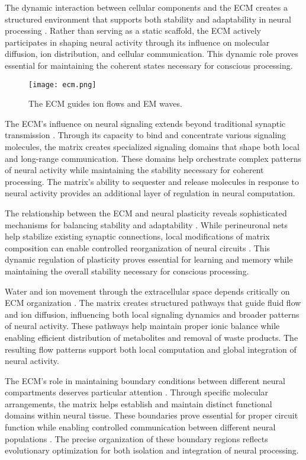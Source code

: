 The dynamic interaction between cellular components and the ECM creates a structured environment that supports both stability and adaptability in neural processing \cite{Dityatev2003}. Rather than serving as a static scaffold, the ECM actively participates in shaping neural activity through its influence on molecular diffusion, ion distribution, and cellular communication. This dynamic role proves essential for maintaining the coherent states necessary for conscious processing.

\begin{figure}[h]
    \centering
    \texttt{[image: ecm.png]}

    \caption{The ECM guides ion flows and EM waves.}
\end{figure}

The ECM's influence on neural signaling extends beyond traditional synaptic transmission \cite{Vargova2014}. Through its capacity to bind and concentrate various signaling molecules, the matrix creates specialized signaling domains that shape both local and long-range communication. These domains help orchestrate complex patterns of neural activity while maintaining the stability necessary for coherent processing. The matrix's ability to sequester and release molecules in response to neural activity provides an additional layer of regulation in neural computation.

The relationship between the ECM and neural plasticity reveals sophisticated mechanisms for balancing stability and adaptability \cite{Dityatev2010}. While perineuronal nets help stabilize existing synaptic connections, local modifications of matrix composition can enable controlled reorganization of neural circuits \cite{Burnside2014}. This dynamic regulation of plasticity proves essential for learning and memory while maintaining the overall stability necessary for conscious processing.

Water and ion movement through the extracellular space depends critically on ECM organization \cite{Hrabetova2009}. The matrix creates structured pathways that guide fluid flow and ion diffusion, influencing both local signaling dynamics and broader patterns of neural activity. These pathways help maintain proper ionic balance while enabling efficient distribution of metabolites and removal of waste products. The resulting flow patterns support both local computation and global integration of neural activity.

The ECM's role in maintaining boundary conditions between different neural compartments deserves particular attention \cite{Barros2011}. Through specific molecular arrangements, the matrix helps establish and maintain distinct functional domains within neural tissue. These boundaries prove essential for proper circuit function while enabling controlled communication between different neural populations \cite{Frischknecht2012}. The precise organization of these boundary regions reflects evolutionary optimization for both isolation and integration of neural processing.

